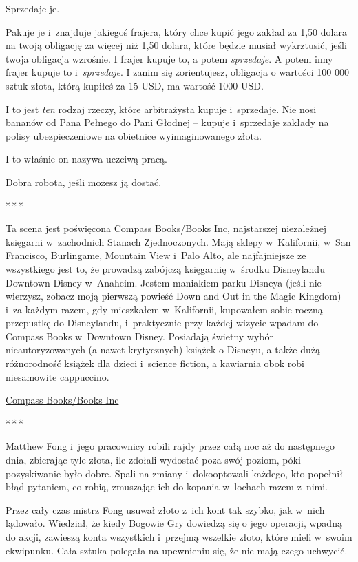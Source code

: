 \documentclass[oneside,polish,11pt,rmheadings]{mwbk}
\newcommand{\threeast}{\par\centerline{*\,*\,*}\medskip\par}
\begin{document}
Sprzedaje je.  


Pakuje je i~znajduje jakiegoś frajera, który chce kupić jego zakład za 1,50 dolara na twoją obligację za więcej niż 1,50 dolara, które będzie musiał wykrztusić, jeśli twoja obligacja wzrośnie. I frajer kupuje to, a potem \textit{sprzedaje}. A potem inny frajer kupuje to i~\textit{sprzedaje}. I zanim się zorientujesz, obligacja o wartości 100 000 sztuk złota, którą kupiłeś za 15 USD, ma wartość 1000 USD. 


I to jest \textit{ten }rodzaj rzeczy, które arbitrażysta kupuje i~sprzedaje. Nie nosi bananów od Pana Pełnego do Pani Głodnej -- kupuje i~sprzedaje zakłady na polisy ubezpieczeniowe na obietnice wyimaginowanego złota. 


I to właśnie on nazywa uczciwą pracą. 


Dobra robota, jeśli możesz ją dostać. 


\bigskip
\threeast


Ta scena jest poświęcona Compass Books/Books Inc, najstarszej niezależnej księgarni w~zachodnich Stanach Zjednoczonych. Mają sklepy w~Kalifornii, w~San Francisco, Burlingame, Mountain View i~Palo Alto, ale najfajniejsze ze wszystkiego jest to, że prowadzą zabójczą księgarnię w~środku Disneylandu Downtown Disney w~Anaheim. Jestem maniakiem parku Disneya (jeśli nie wierzysz, zobacz moją pierwszą powieść Down and Out in the Magic Kingdom) i~za każdym razem, gdy mieszkałem w~Kalifornii, kupowałem sobie roczną przepustkę do Disneylandu, i~praktycznie przy każdej wizycie wpadam do Compass Books w~Downtown Disney. Posiadają świetny wybór nieautoryzowanych (a nawet krytycznych) książek o Disneyu, a także dużą różnorodność książek dla dzieci i~science fiction, a kawiarnia obok robi niesamowite cappuccino. 


\href{https://www.booksinc.net/search/author/%22Doctorow%2C%20Cory%22}{Compass Books/Books Inc} 

\bigskip
\threeast

Matthew Fong i~jego pracownicy robili rajdy przez całą noc aż do następnego dnia, zbierając tyle złota, ile zdołali wydostać poza swój poziom, póki pozyskiwanie było dobre. Spali na zmiany i~dokooptowali każdego, kto popełnił błąd pytaniem, co robią, zmuszając ich do kopania w~lochach razem z~nimi. 


Przez cały czas mistrz Fong usuwał złoto z~ich kont tak szybko, jak w~nich lądowało. Wiedział, że kiedy Bogowie Gry dowiedzą się o jego operacji, wpadną do akcji, zawieszą konta wszystkich i~przejmą wszelkie złoto, które mieli w~swoim ekwipunku. Cała sztuka polegała na upewnieniu się, że nie mają czego uchwycić. 
\end{document}
